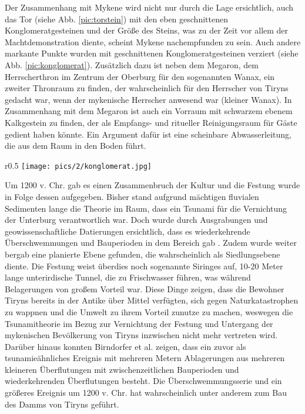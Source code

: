 \documentclass[preprint]{geomorphica} %
\begin{document}
Der Zusammenhang mit Mykene wird nicht nur durch die Lage ersichtlich, auch das Tor (siehe Abb. \ref{pic:torstein}) mit den eben geschnittenen Konglomeratgesteinen und der Größe des Steins, was zu der Zeit vor allem der Machtdemonstration diente, scheint Mykene nachempfunden zu sein. Auch andere markante Punkte wurden mit geschnittenen Konglomeratgesteinen verziert (siehe Abb. \ref{pic:konglomerat}). Zusätzlich dazu ist neben dem Megaron, dem Herrscherthron im Zentrum der Oberburg für den sogenannten Wanax, ein zweiter Thronraum zu finden, der wahrscheinlich für den Herrscher von Tiryns gedacht war, wenn der mykenische Herrscher anwesend war (kleiner Wanax). In Zusammenhang mit dem Megaron ist auch ein Vorraum mit schwarzem ebenem Kalkgestein zu finden, der als Empfangs- und ritueller Reinigungsraum für Gäste gedient haben könnte. Ein Argument dafür ist eine scheinbare Abwasserleitung, die aus dem Raum in den Boden führt.

\begin{wrapfigure}{r}{0.5\textwidth}
    \centering
    \texttt{[image: pics/2/konglomerat.jpg]}
    \caption{Eben geschnittenes Konglomeratgestein am Eingang zum Megaron/Innenhof.}
    \label{pic:konglomerat}
\end{wrapfigure}

Um 1200 v. Chr. gab es einen Zusammenbruch der Kultur und die Festung wurde in Folge dessen aufgegeben. Bisher stand aufgrund mächtigen fluvialen Sedimenten lange die Theorie im Raum, dass ein Tsunami für die Vernichtung der Unterburg verantwortlich war. Doch wurde durch Ausgrabungen und geowissenschaftliche Datierungen ersichtlich, dass es wiederkehrende Überschwemmungen und Bauperioden in dem Bereich gab \cite{birndorferGeoarchaeologicalAnalysesTiryns2022}. Zudem wurde weiter bergab eine planierte Ebene gefunden, die wahrscheinlich als Siedlungsebene diente. Die Festung weist überdies noch sogenannte Siringes auf, 10-20 Meter lange unterirdische Tunnel, die zu Frischwasser führen, was während Belagerungen von großem Vorteil war. Diese Dinge zeigen, dass die Bewohner Tiryns bereits in der Antike über Mittel verfügten, sich gegen Naturkatastrophen zu wappnen und die Umwelt zu ihrem Vorteil zunutze zu machen, weswegen die Tsunamitheorie im Bezug zur Vernichtung der Festung und Untergang der mykenischen Bevölkerung von Tiryns inzwischen nicht mehr vertreten wird. Darüber hinaus konnten Birndorfer et al. \cite{birndorferGeoarchaeologicalAnalysesTiryns2022} zeigen, dass ein zuvor als tsunamieähnliches Ereignis mit mehreren Metern Ablagerungen aus mehreren kleineren Überflutungen mit zwischenzeitlichen Bauperioden und wiederkehrenden Überflutungen besteht. Die Überschwemmungsserie und ein größeres Ereignis um 1200 v. Chr. hat wahrscheinlich unter anderem zum Bau des Damms von Tiryns geführt. 
\end{document}
